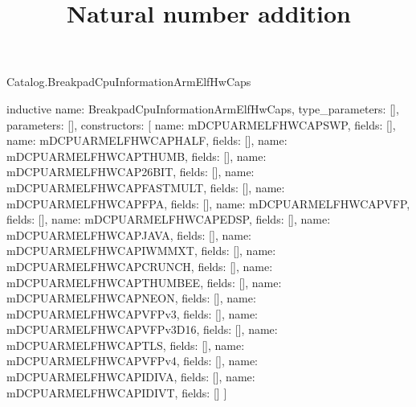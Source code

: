 \begin{lexlean}{Catalog.BreakpadCpuInformationArmElfHwCaps}
\title{Natural number addition}
\begin{semanticmodule}
inductive{
  name: BreakpadCpuInformationArmElfHwCaps,
  type_parameters: [],
  parameters: [],
  constructors: [
    {name: mDCPUARMELFHWCAPSWP, fields: []},
    {name: mDCPUARMELFHWCAPHALF, fields: []},
    {name: mDCPUARMELFHWCAPTHUMB, fields: []},
    {name: mDCPUARMELFHWCAP26BIT, fields: []},
    {name: mDCPUARMELFHWCAPFASTMULT, fields: []},
    {name: mDCPUARMELFHWCAPFPA, fields: []},
    {name: mDCPUARMELFHWCAPVFP, fields: []},
    {name: mDCPUARMELFHWCAPEDSP, fields: []},
    {name: mDCPUARMELFHWCAPJAVA, fields: []},
    {name: mDCPUARMELFHWCAPIWMMXT, fields: []},
    {name: mDCPUARMELFHWCAPCRUNCH, fields: []},
    {name: mDCPUARMELFHWCAPTHUMBEE, fields: []},
    {name: mDCPUARMELFHWCAPNEON, fields: []},
    {name: mDCPUARMELFHWCAPVFPv3, fields: []},
    {name: mDCPUARMELFHWCAPVFPv3D16, fields: []},
    {name: mDCPUARMELFHWCAPTLS, fields: []},
    {name: mDCPUARMELFHWCAPVFPv4, fields: []},
    {name: mDCPUARMELFHWCAPIDIVA, fields: []},
    {name: mDCPUARMELFHWCAPIDIVT, fields: []}
  ]
}
\end{semanticmodule}
\end{lexlean}
